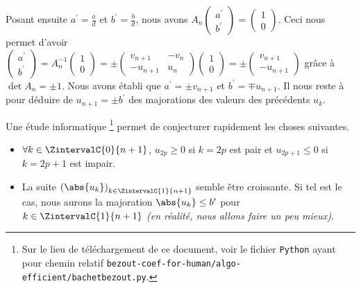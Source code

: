 Posant ensuite $a^\prime = \frac{a}{d}$ et  $b^\prime = \frac{b}{d}$, nous avons
$A_n
 \begin{pmatrix}
 	a^\prime  \\
	b^\prime
 \end{pmatrix}
 =
 \begin{pmatrix}
 	1 \\
	0	
 \end{pmatrix}$.
Ceci nous permet d'avoir
$\begin{pmatrix}
 	a^\prime  \\
	b^\prime
 \end{pmatrix}
 =
 A_n^{-1}
 \begin{pmatrix}
 	1 \\
	0	
 \end{pmatrix}
 =
 \pm
 \begin{pmatrix}
	 v_{n+1}  & -v_n     \\
	 -u_{n+1} & u_n	
 \end{pmatrix}
 \begin{pmatrix}
 	1 \\
	0	
 \end{pmatrix}
 =
 \pm
 \begin{pmatrix}
 	v_{n+1}  \\
	-u_{n+1}	
 \end{pmatrix}$
grâce à $\det A_n = \pm 1$.
Nous avons établi que $a^\prime = \pm v_{n+1}$ et $b^\prime = \mp u_{n+1}$. Il nous reste à  pour déduire de $u_{n+1} = \pm b^\prime$ des majorations des valeurs des précédents $u_k$.


\medskip


Une étude informatique
\footnote{
	Sur le lieu de téléchargement de ce document, voir le fichier \texttt{Python} ayant pour chemin relatif \texttt{bezout-coef-for-human/algo-efficient/bachetbezout.py}.
}
permet de conjecturer rapidement les choses suivantes.

\begin{itemize}[label = \small\textbullet]
	\item $\forall k \in \ZintervalC{0}{n+1}$, $u_{2p} \geq 0$ si $k = 2p$ est pair et $u_{2p+1} \leq 0$ si $k = 2p+1$ est impair.


	\item La suite $\left( \abs{u_k} \right)_{k \in \ZintervalC{1}{n+1}}$ semble être croissante. Si tel est le cas, nous aurons la majoration $\abs{u_k} \leq b^\prime$ pour $k \in \ZintervalC{1}{n+1}$ \emph{(en réalité, nous allons faire un peu mieux)}.
\end{itemize}


